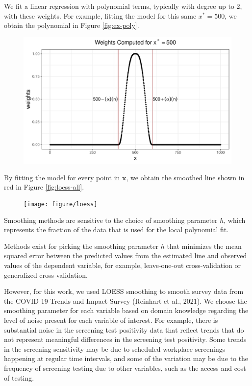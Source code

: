 \documentclass[12pt,twoside]{smiththesis}
\begin{document}
We fit a linear regression with polynomial terms, typically with degree up to 2, with these weights. For example, fitting the model for this same \(x^*=500\), we obtain the polynomial in Figure \ref{fig:ex-poly}.
\begin{flushleft}
\begin{figure}

{\centering \includegraphics[width=1\linewidth]{thesis_files/figure-latex/unnamed-chunk-26-1} 

}

\caption{\label{fig:ex-poly}}\label{fig:unnamed-chunk-26}
\end{figure}
\end{flushleft}
By fitting the model for every point in \(\mathbf x\), we obtain the smoothed line shown in red in Figure \ref{fig:loess-all}.
\begin{figure}

{\centering \texttt{[image: figure/loess]} 

}

\caption{\label{fig:loess-all}}\label{fig:unnamed-chunk-28}
\end{figure}
Smoothing methods are sensitive to the choice of smoothing parameter \(h\), which represents the fraction of the data that is used for the local polynomial fit.

Methods exist for picking the smoothing parameter \(h\) that minimizes the mean squared error between the predicted values from the estimated line and observed values of the dependent variable, for example, leave-one-out cross-validation or generalized cross-validation.

However, for this work, we used LOESS smoothing to smooth survey data from the COVID-19 Trends and Impact Survey (Reinhart et al., 2021).
We choose the smoothing parameter for each variable based on domain knowledge regarding the level of noise present for each variable of interest. For example, there is substantial noise in the screening test positivity data that reflect trends that do not represent meaningful differences in the screening test positivity. Some trends in the screening sensitivity may be due to scheduled workplace screenings happening at regular time intervals, and some of the variation may be due to the frequency of screening testing due to other variables, such as the access and cost of testing.
\end{document}

